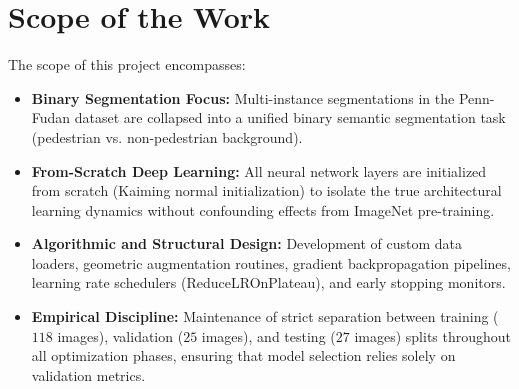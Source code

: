 \documentclass[10pt,a4paper]{report}
\begin{document}
\section{Scope of the Work}
The scope of this project encompasses:
\begin{itemize}
    \item \textbf{Binary Segmentation Focus:} Multi-instance segmentations in the Penn-Fudan dataset are collapsed into a unified binary semantic segmentation task (pedestrian vs. non-pedestrian background).
    \item \textbf{From-Scratch Deep Learning:} All neural network layers are initialized from scratch (Kaiming normal initialization) to isolate the true architectural learning dynamics without confounding effects from ImageNet pre-training.
    \item \textbf{Algorithmic and Structural Design:} Development of custom data loaders, geometric augmentation routines, gradient backpropagation pipelines, learning rate schedulers (ReduceLROnPlateau), and early stopping monitors.
    \item \textbf{Empirical Discipline:} Maintenance of strict separation between training ($118$ images), validation ($25$ images), and testing ($27$ images) splits throughout all optimization phases, ensuring that model selection relies solely on validation metrics.
\end{itemize}
\end{document}
